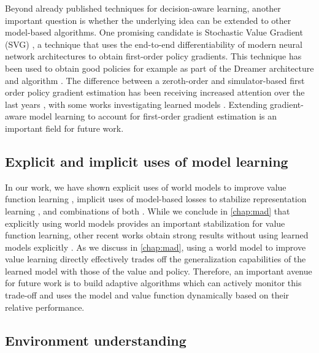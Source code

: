 Beyond already published techniques for decision-aware learning, another important question is whether the underlying idea can be extended to other model-based algorithms.
One promising candidate is Stochastic Value Gradient (SVG) \parencite{heess2015learning,amos2021model}, a technique that uses the end-to-end differentiability of modern neural network architectures to obtain first-order policy gradients.
This technique has been used to obtain good policies for example as part of the Dreamer architecture and algorithm \parencite{hafner2020dream}.
The difference between a zeroth-order and simulator-based first order policy gradient estimation has been receiving increased attention over the last years \parencite{xu2022accelerated,suh2022differentiable,antonova2022rethinking,georgiev2024adaptive}, with some works investigating learned models \parencite{ma2024transformer,georgiev2024adaptive}.
Extending gradient-aware model learning to account for first-order gradient estimation is an important field for future work.

\subsection{Explicit and implicit uses of model learning}

In our work, we have shown explicit uses of world models to improve value function learning \parencite{voelcker2022value}, implicit uses of model-based losses to stabilize representation learning \parencite{voelcker2024when}, and combinations of both \parencite{voelcker2025calibrated,voelcker2025mad}.
While we conclude in \autoref{chap:mad} that explicitly using world models provides an important stabilization for value function learning, other recent works obtain strong results without using learned models explicitly \parencite{fujimoto2025towards}.
As we discuss in \autoref{chap:mad}, using a world model to improve value learning directly effectively trades off the generalization capabilities of the learned model with those of the value and policy.
Therefore, an important avenue for future work is to build adaptive algorithms which can actively monitor this trade-off and uses the model and value function dynamically based on their relative performance.


\subsection{Environment understanding}

